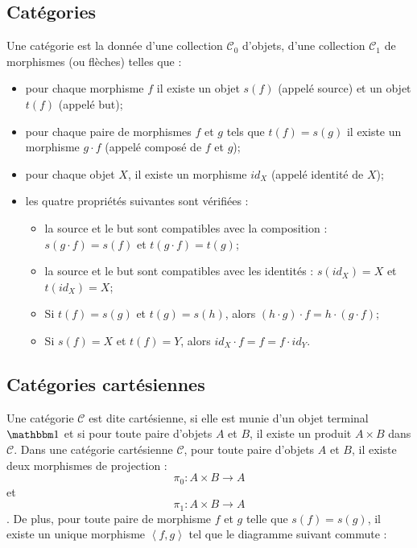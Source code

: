 \documentclass[conference]{IEEEtran}
\begin{document}
\subsection{Catégories} Une catégorie est la donnée d'une collection $\mathcal{C}_0$ d'objets, d'une collection $\mathcal{C}_1$ de morphismes (ou flèches) telles que : 
\begin{itemize}
	\item pour chaque morphisme $f$ il existe un objet $s(f)$ (appelé source) et un objet $t(f)$ (appelé but);
	\item pour chaque paire de morphismes $f$ et $g$ tels que $t(f) = s(g)$ il existe un morphisme $g \cdot f$ (appelé composé de $f$ et $g$);
	\item pour chaque objet $X$, il existe un morphisme $id_X$ (appelé identité de $X$);
	\item les quatre propriétés suivantes sont vérifiées :
	\begin{itemize}
		\item la source et le but sont compatibles avec la composition : $s(g \cdot f) = s(f)$ et $t(g \cdot f) = t(g)$;
		\item la source et le but sont compatibles avec les identités : $s(id_X) = X$ et $t(id_X) = X$;
		\item Si $t(f) = s(g)$ et $t(g) = s(h)$, alors $(h \cdot g) \cdot f = h \cdot (g \cdot f)$;
		\item Si $s(f) = X$ et $t(f) = Y$, alors $id_X \cdot f = f = f \cdot id_Y$.
	\end{itemize}
\end{itemize}

\subsection{Catégories cartésiennes} Une catégorie $\mathcal{C}$ est dite cartésienne, si elle est munie d'un objet terminal $\mathbbm 1$ et si pour toute paire d'objets $A$ et $B$, il existe un produit $A \times B$ dans $\mathcal C$.
Dans une catégorie cartésienne $\mathcal{C}$, pour toute paire d'objets $A$ et $B$, il existe deux morphismes de projection : $$\pi_0 : A \times B \rightarrow A$$ et $$\pi_1 : A \times B \rightarrow A$$. De plus, pour toute paire de morphisme $f$ et $g$ telle que $s(f) = s(g)$, il existe un unique morphisme $\left<f, g\right>$ tel que le diagramme suivant commute :

\begin{center}
\end{center}
\end{document}
